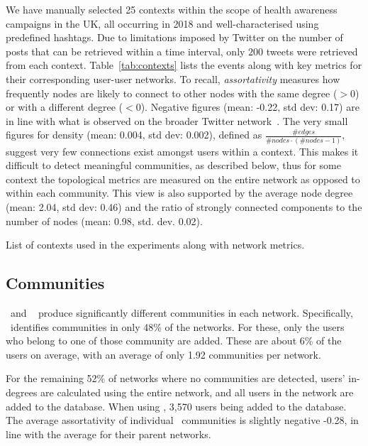 We have manually selected 25 contexts within the scope of health awareness campaigns in the UK, all occurring in 2018 and well-characterised using predefined hashtags.
Due to limitations imposed by Twitter on the number of posts that can be retrieved within a time interval, only $200$ tweets were retrieved from each context.
 Table~\ref{tab:contexts} lists the events along with key metrics for their corresponding user-user networks. 
To recall, \textit{assortativity} measures how frequently nodes are likely to connect to other nodes with the same degree ($>0$) or with a different degree ($<0$). 
Negative figures (mean: -0.22, std dev: 0.17) are in line with what is observed on the broader Twitter network~\cite{Fisher2017}.
%
The very small figures for density (mean: 0.004, std dev: 0.002), defined as $\frac{\#edges }{\mathit{\mathit{\#nodes}} \cdot (\mathit{\#nodes} -1)}$, suggest very few connections exist amongst users within a context. 
This makes it difficult to detect meaningful communities, as described below, thus for some context the topological metrics are measured on the entire network as opposed to within each community.
This view is also supported by the average node degree (mean: 2.04, std dev: 0.46) and the ratio of strongly connected components to the number of nodes (mean: 0.98, std. dev. 0.02).

\begin{table}
	\resizebox{\textwidth}{!}{
	    
	}
	\caption{List of contexts used in the experiments along with network metrics.}
	\label{tab:contexts}
\end{table}

\subsection{Communities}  \label{sec:communities}

 \demon~and \infomap~ produce significantly different communities in each network. 
%
Specifically, \demon~identifies communities in only 48\% of the networks.
For these, only the users who belong to one of those community are added. 
These are about 6\% of the users on average, with an average of only 1.92 communities per network.

For the remaining 52\% of networks where no communities are detected, users' in-degrees are calculated using the entire network, and all users in the network are added to the database.
%
When using \demon, 3,570 users being added to the database.
The average assortativity of individual \demon~communities is slightly negative -0.28, in line with the average for their parent networks.


